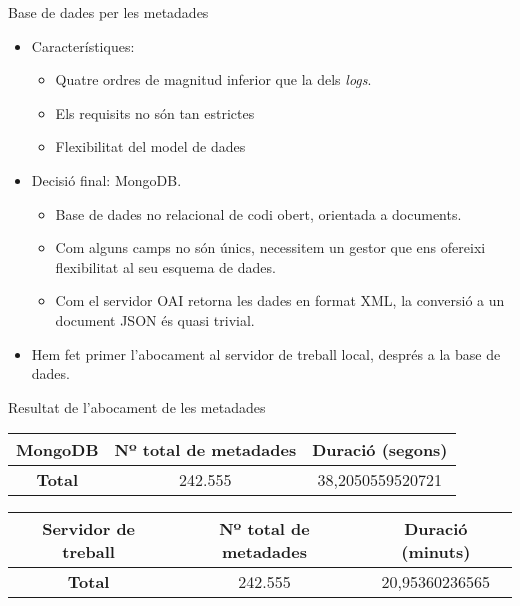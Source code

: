 \begin{frame}{Base de dades per les metadades}
    \begin{itemize}%
        \item Característiques:
        \begin{itemize}
            \item Quatre ordres de magnitud inferior que la dels \textit{logs}.
            \item Els requisits no són tan estrictes
            \item Flexibilitat del model de dades
        \end{itemize}
        \item Decisió final: MongoDB.
        \begin{itemize}
            \item Base de dades no relacional de codi obert, orientada a documents.
            \item Com alguns camps no són únics, necessitem un gestor que ens ofereixi flexibilitat al seu esquema de dades.
            \item Com el servidor OAI retorna les dades en format XML, la conversió a un document JSON és quasi trivial.
        \end{itemize}
        \item Hem fet primer l'abocament al servidor de treball local, després a la base de dades.
    \end{itemize}
\end{frame}


\begin{frame}{Resultat de l'abocament de les metadades}
    \begin{table}[!t]
        \label{tab:table2}
        \centering
        \begin{tabular}{|c|c|c|}
            \hline
            MongoDB & Nº total de metadades & Duració (segons)\\
            \hline
            \textbf{Total} & 242.555 & 38,2050559520721\\
            \hline
        \end{tabular}
    \end{table}

    \begin{table}[!t]
        \label{tab:table3}
        \centering
        \begin{tabular}{|c|c|c|}
            \hline
            Servidor de treball & Nº total de metadades & Duració (minuts)\\
            \hline
            \textbf{Total} & 242.555 & 20,95360236565\\
            \hline
        \end{tabular}
    \end{table}
\end{frame}